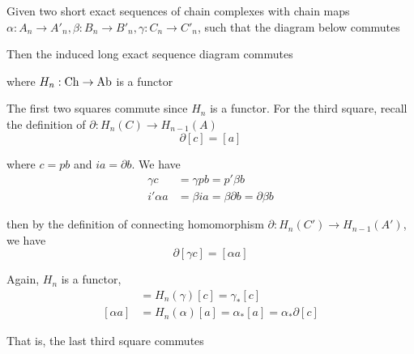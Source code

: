 \documentclass{article}
\begin{document}
\begin{lemma}
    \label{lemma1}
    Given two short exact sequences of chain complexes with chain maps $\alpha: A_n \to A'_n, \beta: B_n \to B'_n, \gamma: C_n \to C'_n$, such that the diagram below commutes
    \begin{center}
    \end{center}
    Then the induced long exact sequence diagram commutes
    \begin{center}
    \end{center}
    where $H_n: \operatorname{Ch} \to \operatorname{Ab}$ is a functor 
\end{lemma}

\begin{longproof}
    The first two squares commute since $H_n$ is a functor. For the third square, recall the definition of $\partial: H_n(C) \to H_{n-1}(A)$
    $$
        \partial [c] = [a]
    $$
    
    where $c = pb$ and $ia = \partial b$. We have
    \begin{align*}
        \gamma c &= \gamma p b = p' \beta b \\
        i' \alpha a &= \beta i a = \beta \partial b = \partial \beta b
    \end{align*}
    
    then by the definition of connecting homomorphism $\partial: H_n(C') \to H_{n-1}(A')$, we have
    $$
        \partial [\gamma c] = [\alpha a]
    $$
    
    Again, $H_n$ is a functor,
    \begin{align*}
        [\gamma c] &= H_n(\gamma) [c] = \gamma_* [c] \\
        [\alpha a] &= H_n(\alpha) [a] = \alpha_* [a] = \alpha_* \partial [c]
    \end{align*}
    
    That is, the last third square commutes
\end{longproof}
\end{document}
